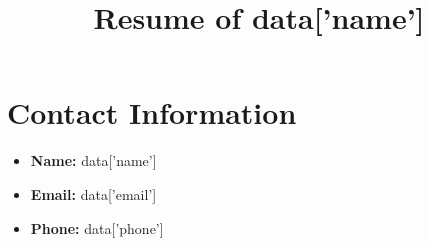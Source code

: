 \documentclass{article}
\begin{document}
\title{Resume of {{ data['name'] }}}
\author{}
\date{}

\maketitle

\section*{Contact Information}
\begin{itemize}
    \item \textbf{Name:} {{ data['name'] }}
    \item \textbf{Email:} {{ data['email'] }}
    \item \textbf{Phone:} {{ data['phone'] }}
\end{itemize}
\end{document}
